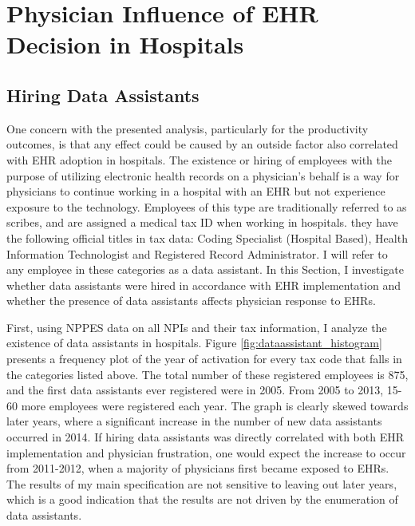 \documentclass[12pt]{article}
\begin{document}
\section{Physician Influence of EHR Decision in Hospitals}

\subsection{Hiring Data Assistants}\label{sec:dataass}

One concern with the presented analysis, particularly for the productivity outcomes, is that any effect could be caused by an outside factor also correlated with EHR adoption in hospitals. The existence or hiring of employees with the purpose of utilizing electronic health records on a physician's behalf is a way for physicians to continue working in a hospital with an EHR but not experience exposure to the technology. Employees of this type are traditionally referred to as scribes, and are assigned a medical tax ID when working in hospitals. they have the following official titles in tax data: Coding Specialist (Hospital Based), Health Information Technologist and Registered Record Administrator. I will refer to any employee in these categories as a data assistant. In this Section, I investigate whether data assistants were hired in accordance with EHR implementation and whether the presence of data assistants affects physician response to EHRs.  

First, using NPPES data on all NPIs and their tax information, I analyze the existence of data assistants in hospitals. Figure \ref{fig:dataassistant_histogram} presents a frequency plot of the year of activation for every tax code that falls in the categories listed above. The total number of these registered employees is 875, and the first data assistants ever registered were in 2005. From 2005 to 2013, 15-60 more employees were registered each year. The graph is clearly skewed towards later years, where a significant increase in the number of new data assistants occurred in 2014. If hiring data assistants was directly correlated with both EHR implementation and physician frustration, one would expect the increase to occur from 2011-2012, when a majority of physicians first became exposed to EHRs. The results of my main specification are not sensitive to leaving out later years, which is a good indication that the results are not driven by the enumeration of data assistants. 
\end{document}
